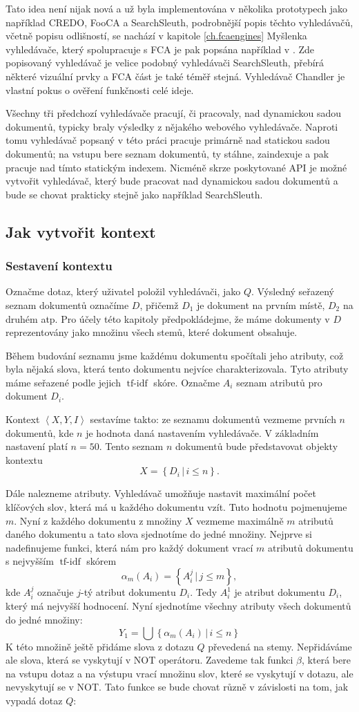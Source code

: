 \documentclass[12pt]{article}
\newcommand{\name}{Chandler}
\newcommand{\sep}{\,|\,}
\newcommand{\ssection}[1]{\subsection{#1}}
\newcommand{\sssection}[1]{\subsubsection{#1}}
\newcommand{\adds}[1]{\left\{#1\right\}}
\newcommand{\addsp}[1]{\left<#1\right>}
\DeclareMathOperator{\tfidf}{tf-idf}
\newcommand{\context}{\addsp{X, Y, I}}
\begin{document}
Tato idea není nijak nová a už byla implementována v několika prototypech jako například CREDO, FooCA a SearchSleuth, podrobnější popis těchto vyhledávačů, včetně popisu odlišností, se nachází v kapitole \ref{ch.fcaengines} Myšlenka vyhledávače, který spolupracuje s FCA je pak popsána například v \cite{fcairslajdy}. Zde popisovaný vyhledávač je velice podobný vyhledávači SearchSleuth, přebírá některé vizuální prvky a FCA část je také téměř stejná. Vyhledávač \name{} je vlastní pokus o ověření funkčnosti celé ideje. 

Všechny tři předchozí vyhledávače pracují, či pracovaly, nad dynamickou sadou dokumentů, typicky braly výsledky z nějakého webového vyhledávače. Naproti tomu vyhledávač popsaný v této práci pracuje primárně nad statickou sadou dokumentů; na vstupu bere seznam dokumentů, ty stáhne, zaindexuje a pak pracuje nad tímto statickým indexem. Nicméně skrze poskytované API je možné vytvořit vyhledávač, který bude pracovat nad dynamickou sadou dokumentů a bude se chovat prakticky stejně jako například SearchSleuth.

\ssection{Jak vytvořit kontext}
\sssection{Sestavení kontextu}
\label{ch.sestaveni}
Označme dotaz, který uživatel položil vyhledávači, jako $Q$. Výsledný seřazený seznam dokumentů označíme $D$, přičemž $D_1$ je dokument na prvním místě, $D_2$ na druhém atp. Pro účely této kapitoly předpokládejme, že máme dokumenty v $D$ reprezentovány jako množinu všech stemů, které dokument obsahuje. 

Během budování seznamu jsme každému dokumentu spočítali jeho atributy, což byla nějaká slova, která tento dokumentu nejvíce charakterizovala. Tyto atributy máme seřazené podle jejich $\tfidf$ skóre. Označme $A_i$ seznam atributů pro dokument $D_i$.

Kontext $\context$ sestavíme takto: ze seznamu dokumentů vezmeme prvních $n$ dokumentů, kde $n$ je hodnota daná nastavením vyhledávače. V základním nastavení platí $n=50$. Tento seznam $n$ dokumentů bude představovat objekty kontextu
$$
X=\adds{D_i\sep i \le n}.
$$

Dále nalezneme atributy. Vyhledávač umožňuje nastavit maximální počet klíčových slov, která má u každého dokumentu vzít. Tuto hodnotu pojmenujeme $m$. Nyní z každého dokumentu z množiny $X$ vezmeme maximálně $m$ atributů daného dokumentu a tato slova sjednotíme do jedné množiny. Nejprve si nadefinujeme funkci, která nám pro každý dokument vrací $m$ atributů dokumentu s nejvyšším $\tfidf$ skórem
$$
\alpha_m(A_i)=\adds{A_i^j\sep j\le m},
$$
kde $A_i^j$ označuje $j$-tý atribut dokumentu $D_i$. Tedy $A_i^1$ je atribut dokumentu $D_i$, který má nejvyšší hodnocení. Nyní sjednotíme všechny atributy všech dokumentů do jedné množiny:
$$
Y_1=\bigcup\adds{\alpha_m(A_i)\sep i \le n}
$$
K této množině ještě přidáme slova z dotazu $Q$ převedená na stemy. Nepřidáváme ale slova, která se vyskytují v NOT operátoru. Zavedeme tak funkci $\beta$, která bere na vstupu dotaz a na výstupu vrací množinu slov, které se vyskytují v dotazu, ale nevyskytují se v NOT. Tato funkce se bude chovat různě v závislosti na tom, jak vypadá dotaz $Q$:
\end{document}
